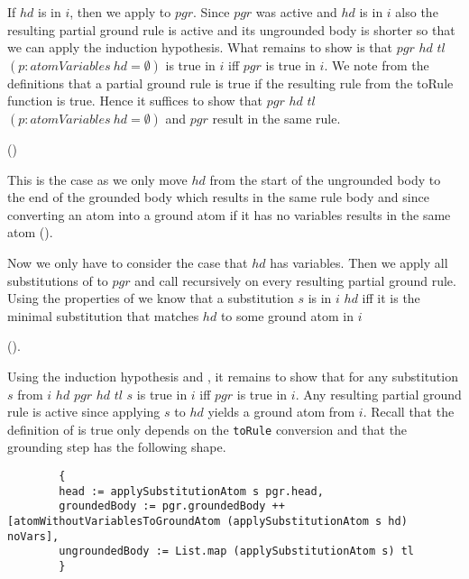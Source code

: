     If $hd$ is in $i$, then we apply \moveAtomWithoutVariables to $pgr$. Since $pgr$ was active and $hd$ is in $i$ also the resulting partial ground rule is active and its ungrounded body is shorter so that we can apply the induction hypothesis. What remains to show is that \moveAtomWithoutVariables $pgr$ $hd$ $tl$ $(p: atomVariables\ hd = \emptyset)$ is true in $i$ iff $pgr$ is true in $i$. We note from the definitions that a partial ground rule is true if the resulting rule from the toRule function is true. Hence it suffices to show that \moveAtomWithoutVariables $pgr$ $hd$ $tl$ $(p: atomVariables\ hd = \emptyset)$ and $pgr$ result in the same rule.
    
    (\partialGroundRuleisTrueofequaltoRule)
    
    This is the case as we only move $hd$ from the start of the ungrounded body to the end of the grounded body which results in the same rule body and since converting an atom into a ground atom if it has no variables results in the same atom (\groundAtomToAtomOfAtomWithoutVariablesToGroundAtomIsSelf).

    Now we only have to consider the case that $hd$ has variables. Then we apply all substitutions of \getSubstitutions to $pgr$ and call \exploreGrounding recursively on every resulting partial ground rule. Using the properties of \matchAtom we know that a substitution $s$ is in \getSubstitutions $i$ $hd$ iff it is the minimal substitution that matches $hd$ to some ground atom in $i$ 
    
    (\inGetSubstitutionsIffMinimalSolutionAndInInterpretation).

    Using the induction hypothesis and \ListmapexceptunitIsUnitIffAll, it remains to show that for any substitution $s$ from \getSubstitutions $i$ $hd$ \groundingStep $pgr$ $hd$ $tl$ $s$ is true in $i$ iff $pgr$ is true in $i$. Any resulting partial ground rule is active since applying $s$ to $hd$ yields a ground atom from $i$. Recall that the definition of is true only depends on the \lstinline|toRule| conversion and that the grounding step has the following shape.

    \begin{lstlisting}
        {
        head := applySubstitutionAtom s pgr.head,
        groundedBody := pgr.groundedBody ++ [atomWithoutVariablesToGroundAtom (applySubstitutionAtom s hd) noVars],
        ungroundedBody := List.map (applySubstitutionAtom s) tl
        }
    \end{lstlisting}

